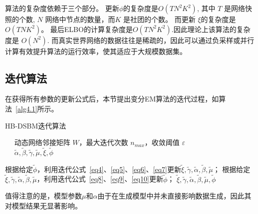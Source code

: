 
算法的复杂度依赖于三个部分。 更新$\phi$的复杂度是$O(TN^2K^2)$, 其中 $T$ 是网络快照的个数,  $N$ 网络中节点的数量，而$K$ 是社团的个数。 而更新 $\xi$的复杂度是$O(TNK^2)$。 最后ELBO的计算复杂度是$O(TN^2K^2)$.因此理论上该算法的复杂度是 $O(N^2)$. 而真实世界网络的数据往往是稀疏的，因此可以通过负采样或并行计算有效提升算法的运行效率，使其适应于大规模数据集。



\subsection{迭代算法}

在获得所有参数的更新公式后，本节提出变分EM算法的迭代过程，如算法~\ref{alg4.1}所示。

\begin{algorithm}
	\caption{HB-DSBM迭代算法}\label{alg4.1}
	\algorithmicrequire ~~ 动态网络邻接矩阵 $W$，最大迭代次数 $n_{max}$，收敛阈值 $\varepsilon$ \\
	\algorithmicensure ~~ $\widetilde{\alpha}, \widetilde{\beta}, \widetilde{\gamma}, \widetilde{\mu}, \widetilde{\xi}, \widetilde{\phi}$ \\
	\begin{algorithmic}[1]
		\REPEAT
		\STATE 根据给定$\widetilde{\phi}$，利用迭代公式~\ref{eq4}、\ref{eq5}、\ref{eq6}、\ref{eq7}更新$\widetilde{\xi}, \widetilde{\gamma}, \widetilde{\alpha}, \widetilde{\beta}, \widetilde{\mu}$；
		\STATE 根据给定$\widetilde{\xi}, \widetilde{\gamma}, \widetilde{\alpha}, \widetilde{\beta}, \widetilde{\mu}$，利用迭代公式~\ref{eq8}、\ref{eq9}、\ref{eq10}更新$\widetilde{\phi}$；
		\RETURN $\widetilde{\xi}, \widetilde{\gamma}, \widetilde{\alpha}, \widetilde{\beta}, \widetilde{\mu}, \widetilde{\phi}$
	\end{algorithmic}
\end{algorithm}
值得注意的是，模型参数$\mu$和$\alpha$由于在生成模型中并未直接影响数据生成，因此其对模型结果无显著影响。

